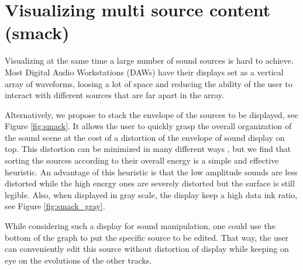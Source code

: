 \documentclass{article}
\begin{document}
\section{Visualizing multi source content (smack)}\label{sec:smack}

Visualizing at the same time a large number of sound sources is hard to achieve. Most Digital Audio Workstations (DAWs) have their displays set as a vertical array of waveforms, loosing a lot of space and reducing the ability of the user to interact with different sources that are far apart in the array.

Alternatively, we propose to stack the envelope of the sources to be displayed, see Figure \ref{fig:smack}. It allows the user to quickly grasp the overall organization of the sound scene at the cost of a distortion of the envelope of sound display on top. This distortion can be minimized in many different ways \cite{Byron2008}, but we find that sorting the sources according to their overall energy is a simple and effective heuristic. An advantage of this heuristic is that the low amplitude sounds are less distorted while the high energy ones are severely distorted but the surface is still legible. Also, when displayed in gray scale, the display keep a high data ink ratio, see Figure \ref{fig:smack_gray}.

While considering such a display for sound manipulation, one could use the bottom of the graph to put the specific source to be edited. That way, the user can conveniently edit this source without distortion of display while keeping on eye on the evolutions of the other tracks.
\end{document}
